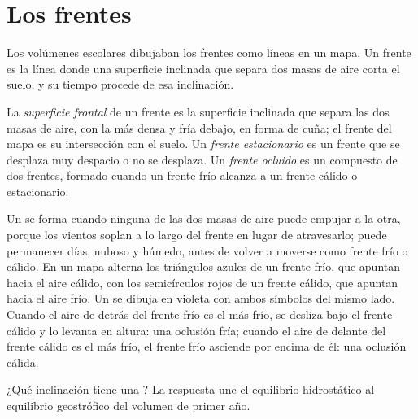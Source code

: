 \section{Los frentes}\label{sec:b2:weather-systems:fronts}

Los volúmenes escolares dibujaban los frentes como líneas en un mapa. Un frente es la línea donde una superficie inclinada
que separa dos masas de aire corta el suelo, y su tiempo procede de esa inclinación.

\begin{definition}\label{def:b2:weather-systems:fronts}
La \emph{superficie frontal} de un frente es la superficie inclinada que separa
las dos masas de aire, con la más densa y fría debajo, en forma de cuña; el frente del mapa es su
intersección con el suelo. Un \emph{frente estacionario} es un frente
que se desplaza muy despacio o no se desplaza. Un \emph{frente ocluido} es un
compuesto de dos frentes, formado cuando un frente frío alcanza a un frente cálido o estacionario.
\end{definition}

Un  se forma cuando ninguna de las dos masas de aire puede empujar a la otra, porque los vientos soplan a lo largo del
frente en lugar de atravesarlo; puede permanecer días, nuboso y húmedo, antes de volver a moverse como frente frío
o cálido. En un mapa alterna los triángulos azules de un frente frío, que apuntan hacia el
aire cálido, con los semicírculos rojos de un frente cálido, que apuntan hacia el aire frío. Un  se dibuja en violeta con ambos símbolos del mismo lado. Cuando el aire de detrás del frente frío
es el más frío, se desliza bajo el frente cálido y lo levanta en altura: una oclusión fría; cuando el aire
de delante del frente cálido es el más frío, el frente frío asciende por encima de él: una oclusión cálida.

¿Qué inclinación tiene una ? La respuesta une el equilibrio hidrostático al equilibrio
geostrófico del volumen de primer año.

